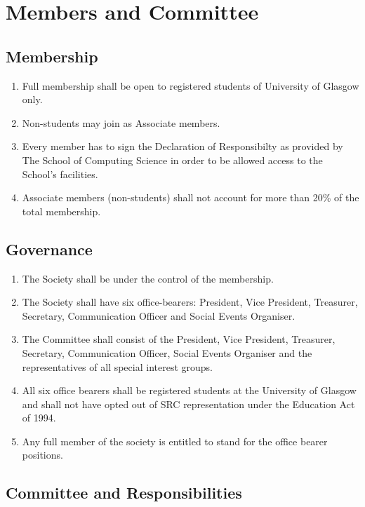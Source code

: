 \documentclass{report}
\newcommand{\bearersNo}{six}
\begin{document}
\chapter{Members and Committee}

\section{Membership}

	\begin{enumerate}
		\item{Full membership shall be open to registered students of University of Glasgow only.}
		\item{Non-students may join as Associate members.}
		\item{Every member has to sign the Declaration of Responsibilty as provided by The School of Computing Science in order to be allowed access to the School's facilities.}
		\item{Associate members (non-students) shall not account for more than 20\% of the total membership.}
	\end{enumerate}

\section{Governance}

	\begin{enumerate}
		\item{The Society shall be under the control of the membership.}
		\item{The Society shall have \bearersNo{} office-bearers: President, Vice President, Treasurer, Secretary, Communication Officer and Social Events Organiser.}
		\item{The Committee shall consist of the President, Vice President, Treasurer, Secretary, Communication Officer, Social Events Organiser and the representatives of all special interest groups.}
		\item{All \bearersNo{} office bearers shall be registered students at the University of Glasgow and shall not have opted out of SRC representation under the Education Act of 1994.}
		\item{Any full member of the society is entitled to stand for the office bearer positions.}
	\end{enumerate}
	
\section{Committee and Responsibilities}
\end{document}
